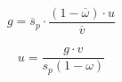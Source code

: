 $$
g = \overline s_p\cdot \frac{(1-\overline\omega)\cdot u}{\overline v}
$$

\begin{equation}
\label{FechKalecki}
u = \frac{g\cdot v}{s_p(1-\omega)}
\end{equation}

\begin{comment}
COMENTÁRIO: Esta parte estava realmente confusa. Mesmo se estivesse clara, estaria desconexa com o parágrafo seguinte

\textcite{steindl_stagnation_1979}, por sua vez, define maturidade como a inadequação da função de lucros diante da taxa de crescimento da economia em que o menor grau de utilização da capacidade em uma estrutura de mercado oligopolista (como em \textcite{kalecki_theory_1954}) acomoda essa menor taxa de investimento, explicando a estagnação. 




Nesta família de modelos, o investimento\footnote{Vale destacar que a função poupança não difere nesses modelos, mas pode ser modificada para permitir uma primeira aproximação  da distribuição pessoal da renda \cites{carvalho_personal_2016}{palley_wage-_2017}. A essência do modelo, como mencionado, está contida na função investimento \ref{InvestoKalecki}.} é determinado por:

\begin{equation}
    \label{InvestoKalecki}
    \frac{I}{K} = \gamma + \gamma_u\cdot u + \gamma_{\pi}\pi = g
\end{equation}
em que $\gamma$ é a parcela autônoma do investimento, $\gamma_u$ representa a sensibilidade do investimento à mudanças no grau de utilização e $\gamma_{\pi}$ em relação ao \textit{profit-share}\footnote{Esse último termo é destacado para evidenciar a crítica de \textcite{bhaduri_unemployment_1990} que inaugura os modelos pós-kaleckianos. Argumenta-se a inclusão deste componente não altera o mecanismo de funcionamento do modelo, mas amplia os resultados possíveis.}. Partindo da versão mais simplificada em que o investimento induzido depende apenas do grau de utilização ($\gamma_{\pi} = 0$),  a equação \ref{InvestoKalecki} pode ser tratada em termos da equação \ref{Sintetica}:

$$
\gamma + \gamma_u\cdot u = \mybox{g = g_K} = f\frac{s u}{\overline v}
$$
Tal como no modelo de Cambridge, supõe-se que o componente autônomo do investimento seja exógeno ($\gamma = \overline \gamma$) e que a propensão marginal a poupar é definida exogenamente e idêntica a propensão média ($f=1$), ou seja

$$
\gamma_u\cdot u = \frac{\overline s u}{\overline v} - \overline \gamma
$$
rearranjando:
$$
u = \left(\frac{\overline s u}{\overline v} - \overline \gamma\right)\frac{1}{\gamma_u}
$$

\begin{equation}
\label{FechKalecki}
    \therefore u =  \left(\frac{\overline \gamma\cdot v}{\overline s - \gamma_u}\right)
\end{equation}
\end{comment}

